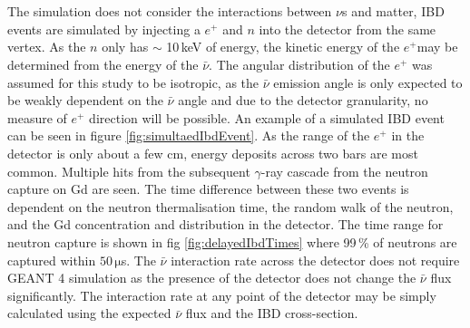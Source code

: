 \\\\The simulation does not consider the interactions between $\nu$s and matter, IBD events are simulated by injecting a $e^+$ and $n$ into the detector from the same vertex. As the $n$ only has $\sim$ 10\,keV of energy, the kinetic energy of the $e^+$may be determined from the energy of the $\bar{\nu}$. The angular distribution of the $e^+$ was assumed for this study to be isotropic, as the $\bar{\nu}$ emission angle is only expected to be weakly dependent on the $\bar{\nu}$ angle \cite{Vogel_1999} and due to the detector granularity, no measure of $e^+$ direction will be possible. An example of a simulated IBD event can be seen in figure \ref{fig:simultaedIbdEvent}. As the range of the $e^+$ in the detector is only about a few cm, energy deposits across two bars are most common. Multiple hits from the subsequent $\gamma$-ray cascade from the neutron capture on Gd are seen. The time difference between these two events is dependent on the neutron thermalisation time, the random walk of the neutron, and the Gd concentration and distribution in the detector. The time range for neutron capture is shown in fig \ref{fig:delayedIbdTimes} where 99\,\% of neutrons are captured within $50\,\mathrm{\mu}$s. The $\bar{\nu}$ interaction rate across the detector does not require GEANT 4 simulation as the presence of the detector does not change the $\bar{\nu}$ flux significantly. The interaction rate at any point of the detector may be simply calculated using the expected $\bar{\nu}$ flux and the IBD cross-section.

